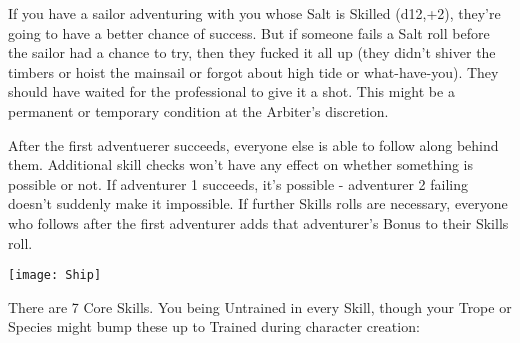 {  If you have a sailor adventuring with you whose Salt is Skilled (d12,+2), they're going to have a better chance of success.  But if someone fails a Salt roll before the sailor had a chance to try, then they fucked it all up (they didn't shiver the timbers or hoist the mainsail or forgot about high tide or what-have-you).  They should have waited for the professional to give it a shot.  This might be a permanent or temporary condition at the Arbiter's discretion.

  After the first adventuerer succeeds, everyone else is able to follow along behind them.  Additional skill checks won't have any effect on whether something is possible or not.  If adventurer 1 succeeds, it's possible - adventurer 2 failing doesn't suddenly make it impossible.  If further Skills rolls are necessary, everyone who follows after the first adventurer adds that adventurer's Bonus to their Skills roll.

    \begin{center}
  \texttt{[image: Ship]}
  \end{center}
 
  \cbreak


  There are 7 Core Skills.  You being Untrained in every Skill, though your Trope or Species might bump these up to Trained during character creation:





}
